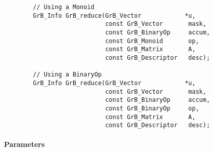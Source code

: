 \begin{verbatim}
        // Using a Monoid
        GrB_Info GrB_reduce(GrB_Vector            *u,
                            const GrB_Vector       mask,
                            const GrB_BinaryOp     accum,
                            const GrB_Monoid       op,  
                            const GrB_Matrix       A,
                            const GrB_Descriptor   desc);
                            
        // Using a BinaryOp
        GrB_Info GrB_reduce(GrB_Vector            *u,
                            const GrB_Vector       mask,
                            const GrB_BinaryOp     accum,
                            const GrB_BinaryOp     op,  
                            const GrB_Matrix       A,
                            const GrB_Descriptor   desc);
\end{verbatim}

\paragraph{Parameters}

